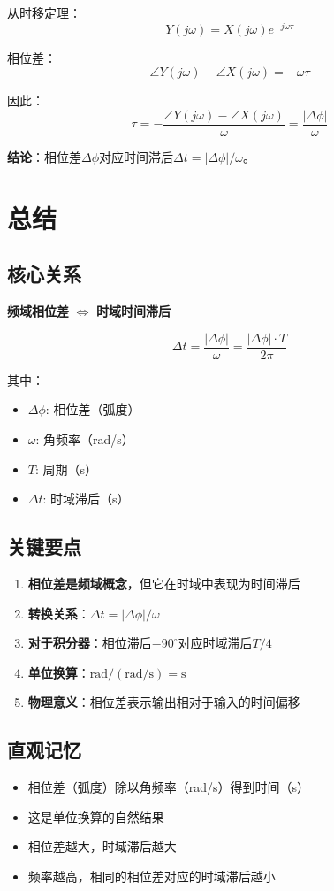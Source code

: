 \documentclass[12pt,a4paper]{article}
\begin{document}
从时移定理：
\begin{equation}
Y(j\omega) = X(j\omega) e^{-j\omega \tau}
\end{equation}

相位差：
\begin{equation}
\angle Y(j\omega) - \angle X(j\omega) = -\omega \tau
\end{equation}

因此：
\begin{equation}
\tau = -\frac{\angle Y(j\omega) - \angle X(j\omega)}{\omega} = \frac{|\Delta \phi|}{\omega}
\end{equation}

\textbf{结论}：相位差$\Delta \phi$对应时间滞后$\Delta t = |\Delta \phi|/\omega$。

\section{总结}

\subsection{核心关系}

\textbf{频域相位差} $\Leftrightarrow$ \textbf{时域时间滞后}

\begin{equation}
\Delta t = \frac{|\Delta \phi|}{\omega} = \frac{|\Delta \phi| \cdot T}{2\pi}
\end{equation}

其中：
\begin{itemize}
\item $\Delta \phi$: 相位差（弧度）
\item $\omega$: 角频率（rad/s）
\item $T$: 周期（s）
\item $\Delta t$: 时域滞后（s）
\end{itemize}

\subsection{关键要点}

\begin{enumerate}
\item \textbf{相位差是频域概念}，但它在时域中表现为时间滞后
\item \textbf{转换关系}：$\Delta t = |\Delta \phi|/\omega$
\item \textbf{对于积分器}：相位滞后$-90^\circ$对应时域滞后$T/4$
\item \textbf{单位换算}：$\text{rad} / (\text{rad/s}) = \text{s}$
\item \textbf{物理意义}：相位差表示输出相对于输入的时间偏移
\end{enumerate}

\subsection{直观记忆}

\begin{itemize}
\item 相位差（弧度）除以角频率（rad/s）得到时间（s）
\item 这是单位换算的自然结果
\item 相位差越大，时域滞后越大
\item 频率越高，相同的相位差对应的时域滞后越小
\end{itemize}
\end{document}
